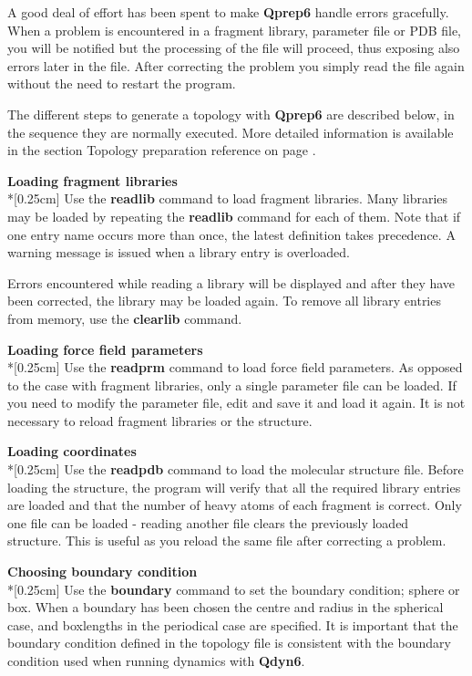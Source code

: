 \documentclass[a4paper,11pt]{article}
\begin{document}
A good deal of effort has been spent to make \textbf{Qprep6} handle errors
gracefully. When a problem is encountered in a fragment library,
parameter file or PDB file, you will be notified but the
processing of the file will proceed, thus exposing also errors
later in the file. After correcting the problem you simply read
the file again without the need to restart the program.

The different steps to generate a topology with \textbf{Qprep6} are
described below, in the sequence they are normally executed. More
detailed information is available in the section Topology
preparation reference on page \pageref{subsec:top_prep_ref}.

\textbf{Loading fragment libraries}\\*[0.25cm] Use the
\textbf{readlib} command to load fragment libraries. Many
libraries may be loaded by repeating the \textbf{readlib} command
for each of them. Note that if one entry name occurs more than
once, the latest definition takes precedence. A warning message is
issued when a library entry is overloaded.

Errors encountered while reading a library will be displayed and
after they have been corrected, the library may be loaded again.
To remove all library entries from memory, use the
\textbf{clearlib} command.

\textbf{Loading force field parameters}\\*[0.25cm] Use the
\textbf{readprm } command to load force field parameters. As
opposed to the case with fragment libraries, only a single
parameter file can be loaded. If you need to modify the parameter
file, edit and save it and load it again. It is not necessary to
reload fragment libraries or the structure.

\textbf{Loading coordinates}\\*[0.25cm] Use the \textbf{readpdb}
command to load the molecular structure file. Before loading the
structure, the program will verify that all the required library
entries are loaded and that the number of heavy atoms of each
fragment is correct. Only one file can be loaded - reading another
file clears the previously loaded structure. This is useful as you
reload the same file after correcting a problem.

\textbf{Choosing boundary condition}\\*[0.25cm] Use the
\textbf{boundary} command to set the boundary condition; sphere or
box. When a boundary has been chosen the centre and radius in the
spherical case, and boxlengths in the periodical case are
specified. It is important that the boundary condition defined in
the topology file is consistent with the boundary condition used
when running dynamics with \textbf{Qdyn6}.
\end{document}
